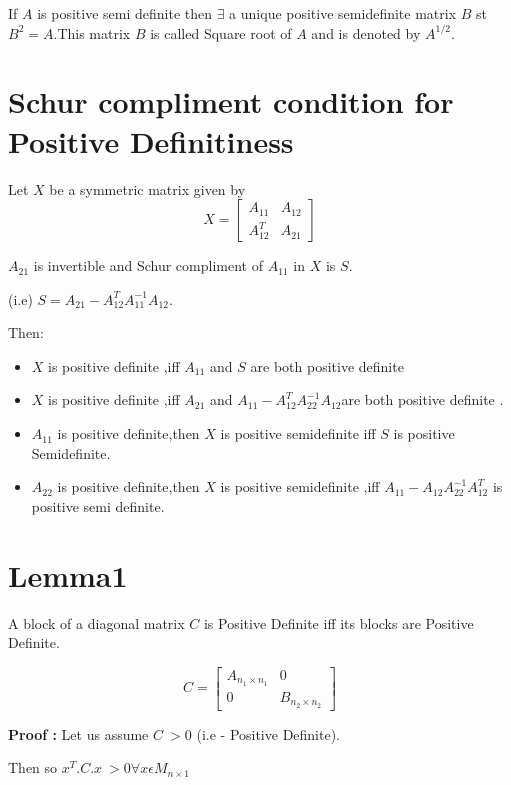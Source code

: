 If $A$ is positive semi definite then $\exists$ a unique positive semidefinite matrix $B$ st $ B ^{2} =A $.This matrix $B$ is
called Square root of $A$ and is denoted by $A^{1/2}$.


\section{Schur compliment condition for Positive Definitiness}
Let $X$ be a symmetric matrix given by $$ X= \begin{bmatrix}A_{11}&A_{12}\\A^{T}_{12}&A_{21}\end{bmatrix}$$

$A_{21}$ is invertible and Schur compliment of $A_{11}$ in $X$ is $S$.

(i.e) $S = A_{21}-A_{12}^{T}A_{11}^{-1}A_{12}$.

Then:
\begin{itemize}
\item $X$ is positive definite ,iff $A_{11}$  and $S$ are both positive definite 
\item $X$ is positive definite ,iff $A_{21} $   and $ A_{11}-A^{T}_{12}A^{-1}_{22}A_{12}$are both positive definite .
\item  $A_{11}$ is positive definite,then $X$ is positive semidefinite iff $S$ is positive Semidefinite.
\item $A_{22}$ is positive definite,then $X$ is positive semidefinite ,iff $A_{11}-A_{12}A^{-1}_{22}A^{T}_{12}$ is positive
semi definite.
\end{itemize}


\section{Lemma1}
A block of a diagonal matrix $C$ is Positive Definite iff its blocks are Positive Definite.

$$C= 
\begin{bmatrix}
  A_{n_1\times n_1} & 0\\
 0&B_{n_{2}\times n_{2}}
\end{bmatrix}$$

{\bf Proof : }
Let us assume $C\ > $0  (i.e - Positive Definite). 
 
Then so $ x^{T}.C.x\ >  0  \forall x \epsilon M_{n\times 1}$

